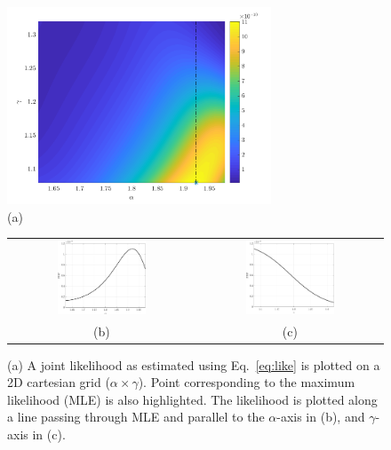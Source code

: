 \begin{figure}[htbp]
 \begin{center}
  \includegraphics[width=0.70\textwidth]{./Figures/gl}
  \\ (a)
  \begin{tabular}{cc}
  \includegraphics[width=0.50\textwidth]{./Figures/pdf_alpha}
  &
  \includegraphics[width=0.50\textwidth]{./Figures/pdf_gamma}
  \\ (b) & (c)
  \end{tabular}
\caption{(a) A joint likelihood as estimated using Eq.~\ref{eq:like} is plotted on a 2D cartesian grid
 ($\alpha\times\gamma$). Point corresponding to the maximum likelihood (MLE) is also highlighted.
 The likelihood is plotted along a line passing through MLE and parallel to the $\alpha$-axis
 in (b), and $\gamma$-axis in (c).}
\label{fig:like}
\end{center}
\end{figure}

